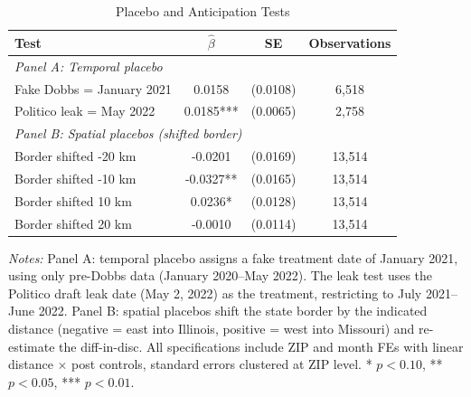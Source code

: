 \begin{table}[H]
\centering
\caption{Placebo and Anticipation Tests}
\label{tab:placebo}
\begin{threeparttable}
\begin{tabular}{lccc}
\toprule
Test & $\hat{\beta}$ & SE & Observations \\
\midrule
\multicolumn{4}{l}{\textit{Panel A: Temporal placebo}} \\
Fake Dobbs = January 2021 & 0.0158 & (0.0108) & 6,518 \\
Politico leak = May 2022 & 0.0185*** & (0.0065) & 2,758 \\
\midrule
\multicolumn{4}{l}{\textit{Panel B: Spatial placebos (shifted border)}} \\
Border shifted -20 km & -0.0201 & (0.0169) & 13,514 \\
Border shifted -10 km & -0.0327** & (0.0165) & 13,514 \\
Border shifted 10 km & 0.0236* & (0.0128) & 13,514 \\
Border shifted 20 km & -0.0010 & (0.0114) & 13,514 \\
\bottomrule
\end{tabular}
\begin{tablenotes}[flushleft]
\small
\item \textit{Notes:} Panel A: temporal placebo assigns a fake treatment date of January 2021, using only pre-Dobbs data (January 2020--May 2022). The leak test uses the Politico draft leak date (May 2, 2022) as the treatment, restricting to July 2021--June 2022. Panel B: spatial placebos shift the state border by the indicated distance (negative = east into Illinois, positive = west into Missouri) and re-estimate the diff-in-disc. All specifications include ZIP and month FEs with linear distance $\times$ post controls, standard errors clustered at ZIP level. * $p<0.10$, ** $p<0.05$, *** $p<0.01$.
\end{tablenotes}
\end{threeparttable}
\end{table}
